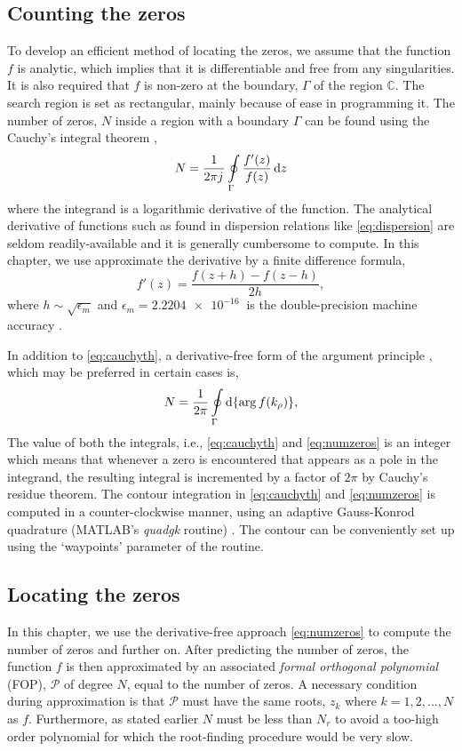 \subsection{Counting the zeros}
%
To develop an efficient method of locating the zeros, we assume that the function $f$ is analytic, which implies that it is differentiable and free from any singularities. It is also required that $f$ is non-zero at the boundary, $\Gamma$ of the region $\mathbb{C}$. The search region is set as rectangular, mainly because of ease in programming it. The number of zeros, $N$ inside a region with a boundary $\Gamma$ can be found using the Cauchy's integral theorem \cite[pg. 71]{Krantz1999,Delves1967c},
%
\begin{equation}
  N = \frac{1}{2 \pi {j}\mkern1mu} \oint \limits_{\Gamma} \frac{f'(z)}{f(z)} \mathop{}\!\mathrm{d}{z}
  \label{eq:cauchyth}
\end{equation}
%
where the integrand is a logarithmic derivative of the function. The analytical derivative of functions such as found in dispersion relations like \eqref{eq:dispersion} are seldom readily-available and it is generally cumbersome to compute. In this chapter, we use approximate the derivative by a finite difference formula,
%
\begin{equation}
  f'(z) = \frac{f(z + h) - f(z - h)}{2 h},
  \label{eq:FD}
\end{equation}
%
where $h \sim \sqrt{\epsilon_m}$ and $\epsilon_m = \SI{2.2204e-16}{}$ is the double-precision machine accuracy \cite[pg. 230]{Press2007}.

In addition to \eqref{eq:cauchyth}, a derivative-free form of the argument principle \cite{Carpentier1982c,Gillan2006c}, which may be preferred in certain cases is,
%
\begin{equation}
 N = \frac{1}{2 \pi} \oint \limits_{\Gamma} \mathop{}\!\mathrm{d} {\{ \arg f(k_{\rho})\}},
 \label{eq:numzeros}
\end{equation}
%
The value of both the integrals, i.e., \eqref{eq:cauchyth} and \eqref{eq:numzeros} is an integer which means that whenever a zero is encountered that appears as a pole in the integrand, the resulting integral is incremented by a factor of $2 \pi$ by Cauchy's residue theorem. The contour integration in \eqref{eq:cauchyth} and \eqref{eq:numzeros} is computed in a counter-clockwise manner, using an adaptive Gauss-Konrod quadrature ({MATLAB}'s \emph{quadgk} routine) \cite{Shampine2008}. The contour can be conveniently set up using the `waypoints' parameter of the routine.
\subsection{Locating the zeros}
%
In this chapter, we use the derivative-free approach \eqref{eq:numzeros} to compute the number of zeros and further on. After predicting the number of zeros, the function $f$ is then approximated by an associated \emph{formal orthogonal polynomial} (FOP), $\mathcal P$ of degree $N$, equal to the number of zeros. A necessary condition during approximation is that $\mathcal P$ must have the same roots, $z_k$ where $k = 1,2,...,N$ as $f$. Furthermore, as stated earlier $N$ must be less than $N_r$ to avoid a too-high order polynomial for which the root-finding procedure would be very slow.

